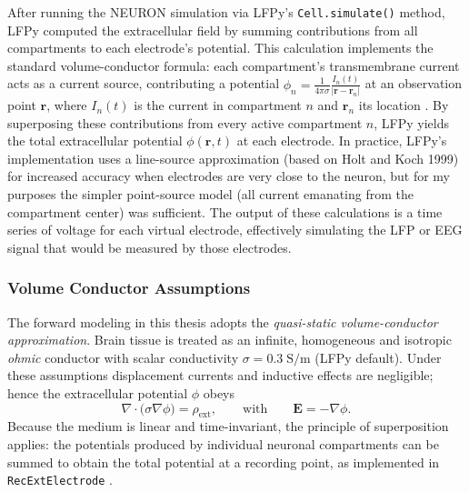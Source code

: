 \documentclass[final, a4paper,masters,en,listoffigures,listoftables,norwegiandates]{NMBU}
\begin{document}
After running the NEURON simulation via LFPy’s \texttt{Cell.simulate()} method, LFPy computed the extracellular field by summing contributions from all compartments to each electrode’s potential. This calculation implements the standard volume-conductor formula: each compartment’s transmembrane current acts as a current source, contributing a potential $\phi_n = \frac{1}{4\pi\sigma}\frac{I_n(t)}{|\mathbf{r}-\mathbf{r}_n|}$ at an observation point $\mathbf{r}$, where $I_n(t)$ is the current in compartment $n$ and $\mathbf{r}_n$ its location \cite{Linden2014}. By superposing these contributions from every active compartment $n$, LFPy yields the total extracellular potential $\phi(\mathbf{r},t)$ at each electrode. In practice, LFPy’s implementation uses a line-source approximation (based on Holt and Koch 1999\cite{Holt1999}) for increased accuracy when electrodes are very close to the neuron, but for my purposes the simpler point-source model (all current emanating from the compartment center) was sufficient. The output of these calculations is a time series of voltage for each virtual electrode, effectively simulating the LFP or EEG signal that would be measured by those electrodes.

\subsubsection{Volume Conductor Assumptions}
The forward modeling in this thesis adopts the \emph{quasi-static volume-conductor approximation}. 
Brain tissue is treated as an infinite, homogeneous and isotropic \emph{ohmic} conductor with scalar conductivity $\sigma = 0.3\;\mathrm{S/m}$ (LFPy default). Under these assumptions displacement currents and inductive effects are negligible; hence the extracellular potential $\phi$ obeys
\begin{equation}
  \nabla\!\cdot\!\bigl(\sigma\nabla\phi\bigr) = \rho_{\text{ext}}, 
  \qquad\text{with}\qquad
  \mathbf{E} = -\nabla\phi .
  \label{eq:quasistatic}
\end{equation}
Because the medium is linear and time-invariant, the principle of superposition applies: 
the potentials produced by individual neuronal compartments can be summed to obtain the total potential at a recording point, as implemented in \texttt{RecExtElectrode} \cite{PlonseyHeppner1967,Hamalainen1993}.
\end{document}

